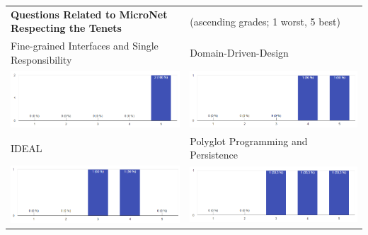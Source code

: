 \begin{center}
  	\hspace*{-1.9cm}
  	\begin{tabular}{ p{8.7cm} p{8.7cm} }
  
    	\textbf{Questions Related to MicroNet Respecting the \msuc{} Tenets} & 
  		(ascending grades; 1 worst, 5 best) \\[.7cm]
  		
  		Fine-grained Interfaces and Single Responsibility &
		Domain-Driven-Design\\
		\includegraphics[width=\linewidth]{images/survey/tenet1}
    	&
    	\includegraphics[width=\linewidth]{images/survey/tenet2}\\[.7cm]

		IDEAL &
		Polyglot Programming and Persistence\\
		\includegraphics[width=\linewidth]{images/survey/tenet3}
    	&
    	\includegraphics[width=\linewidth]{images/survey/tenet4}\\[.7cm]
		

\end{tabular}
\end{center}
